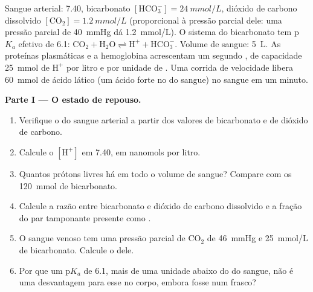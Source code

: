 \begin{problem}
\label{pb:b1:water-small-molecules:1}
Sangue arterial:  7.40, bicarbonato $[\mathrm{HCO_3^-}] =
\qty{24}{mmol/L}$, dióxido de carbono dissolvido $[\mathrm{CO_2}] =
\qty{1.2}{mmol/L}$ (proporcional à pressão parcial dele: uma pressão
parcial de \qty{40}{mmHg} dá \qty{1.2}{mmol/L}). O sistema do
bicarbonato tem p$K_a$ efetivo de 6.1: $\mathrm{CO_2} + \mathrm{H_2O}
\rightleftharpoons \mathrm{H^+} + \mathrm{HCO_3^-}$. Volume de sangue:
\qty{5}{L}. As proteínas plasmáticas e a hemoglobina acrescentam um
segundo , de capacidade \qty{25}{mmol} de $\mathrm{H^+}$ por litro
e por unidade de . Uma corrida de velocidade libera \qty{60}{mmol} de
ácido lático (um ácido forte no  do sangue) no sangue em um minuto.

\medskip
\noindent\textbf{Parte I --- O estado de repouso.}
\begin{enumerate}
  \item Verifique o  do sangue arterial a partir dos valores de
        bicarbonato e de dióxido de carbono.
  \item Calcule o $[\mathrm{H^+}]$ em  7.40, em nanomols por litro.
  \item Quantos prótons livres há em todo o volume de sangue? Compare
        com os \qty{120}{mmol} de bicarbonato.
  \item Calcule a razão entre bicarbonato e dióxido de carbono
        dissolvido e a fração do par tamponante presente como .
  \item O sangue venoso tem uma pressão parcial de $\mathrm{CO_2}$ de
        \qty{46}{mmHg} e \qty{25}{mmol/L} de bicarbonato. Calcule o 
        dele.
  \item Por que um p$K_a$ de 6.1, mais de uma unidade abaixo do  do
        sangue, não é uma desvantagem para esse  no corpo, embora
        fosse num frasco?
\end{enumerate}


\end{problem}
